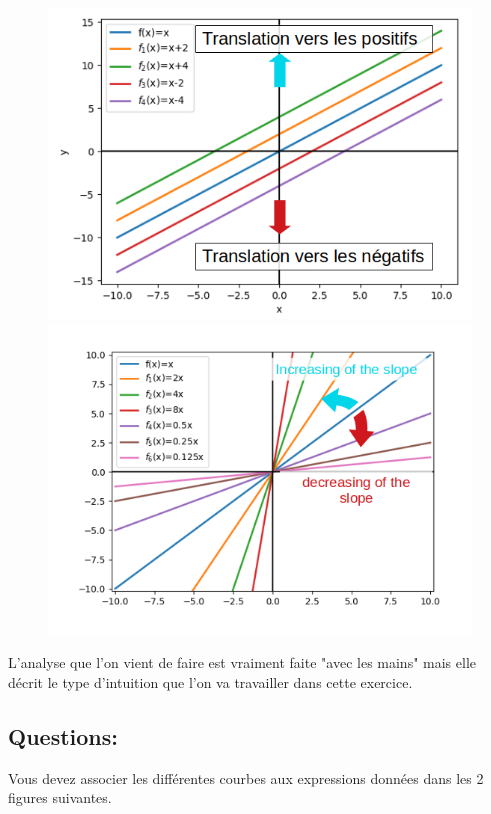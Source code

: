 \documentclass[11pt, french]{article}
\begin{document}
\begin{figure}[!h]
\center
\includegraphics[scale=0.49]{assets/serie_4_exo_1_figure_1.png}
\includegraphics[scale=0.54]{assets/serie_4_exo_1_figure_2.png}
\label{fig:p_s_4_exo1-fig1+2}
\end{figure}

L'analyse que l'on vient de faire est vraiment faite "avec les mains" mais elle décrit le type d'intuition que l'on va travailler dans cette exercice.

\subsection*{Questions:}
Vous devez associer les différentes courbes aux expressions données dans les 2 figures suivantes.
\end{document}
